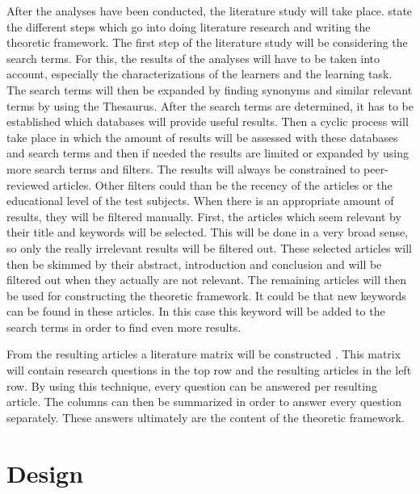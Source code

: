 \documentclass[12pt]{report} %
\begin{document}
After the analyses have been conducted, the literature study will take place.  state the different steps which go into doing literature research and writing the theoretic framework. The first step of the literature study will be considering the search terms. For this, the results of the analyses will have to be taken into account, especially the characterizations of the learners and the learning task. The search terms will then be expanded by finding synonyms and similar relevant terms by using the Thesaurus. After the search terms are determined, it has to be established which databases will provide useful results. Then a cyclic process will take place in which the amount of results will be assessed with these databases and search terms and then if needed the results are limited or expanded by using more search terms and filters. The results will always be constrained to peer-reviewed articles. Other filters could than be the recency of the articles or the educational level of the test subjects. When there is an appropriate amount of results, they will be filtered manually. First, the articles which seem relevant by their title and keywords will be selected. This will be done in a very broad sense, so only the really irrelevant results will be filtered out. These selected articles will then be skimmed by their abstract, introduction and conclusion and will be filtered out when they actually are not relevant. The remaining articles will then be used for constructing the theoretic framework. It could be that new keywords can be found in these articles. In this case this keyword will be added to the search terms in order to find even more results.

From the resulting articles a literature matrix will be constructed \cite{lerencomm}. This matrix will contain research questions in the top row and the resulting articles in the left row. By using this technique, every question can be answered per resulting article. The columns can then be summarized in order to answer every question separately. These answers ultimately are the content of the theoretic framework.

\section{Design}
\end{document}
